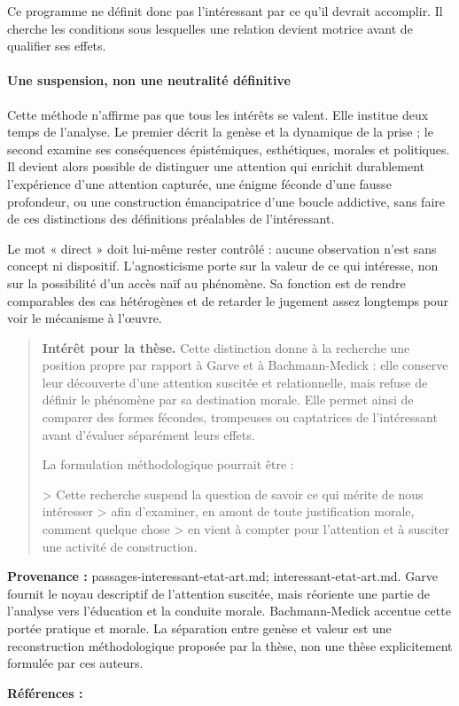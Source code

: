 \documentclass[10pt,a4paper]{article}
\begin{document}
Ce programme ne définit donc pas l'intéressant par ce qu'il devrait accomplir. Il cherche les conditions sous lesquelles une relation devient motrice avant de qualifier ses effets.

\paragraph{Une suspension, non une neutralité définitive}
Cette méthode n'affirme pas que tous les intérêts se valent. Elle institue deux temps de l'analyse. Le premier décrit la genèse et la dynamique de la prise ; le second examine ses conséquences épistémiques, esthétiques, morales et politiques. Il devient alors possible de distinguer une attention qui enrichit durablement l'expérience d'une attention capturée, une énigme féconde d'une fausse profondeur, ou une construction émancipatrice d'une boucle addictive, sans faire de ces distinctions des définitions préalables de l'intéressant.

Le mot « direct » doit lui-même rester contrôlé : aucune observation n'est sans concept ni dispositif. L'agnosticisme porte sur la valeur de ce qui intéresse, non sur la possibilité d'un accès naïf au phénomène. Sa fonction est de rendre comparables des cas hétérogènes et de retarder le jugement assez longtemps pour voir le mécanisme à l'œuvre.

\begin{quote}
\textbf{Intérêt pour la thèse.} Cette distinction donne à la recherche une position propre par rapport à Garve et à Bachmann-Medick : elle conserve leur découverte d'une attention suscitée et relationnelle, mais refuse de définir le phénomène par sa destination morale. Elle permet ainsi de comparer des formes fécondes, trompeuses ou captatrices de l'intéressant avant d'évaluer séparément leurs effets.

La formulation méthodologique pourrait être :

> Cette recherche suspend la question de savoir ce qui mérite de nous intéresser > afin d'examiner, en amont de toute justification morale, comment quelque chose > en vient à compter pour l'attention et à susciter une activité de construction.
\end{quote}
{\footnotesize\color{metadata}\textbf{Provenance :} passages-interessant-etat-art.md; interessant-etat-art.md. Garve fournit le noyau descriptif de l'attention suscitée, mais réoriente une partie de l'analyse vers l'éducation et la conduite morale. Bachmann-Medick accentue cette portée pratique et morale. La séparation entre genèse et valeur est une reconstruction méthodologique proposée par la thèse, non une thèse explicitement formulée par ces auteurs.\par}
{\footnotesize\color{metadata}\textbf{Références :} \parencite{garve1779interessirende,bachmannmedick2008anziehungskraft}\par}
\end{document}
